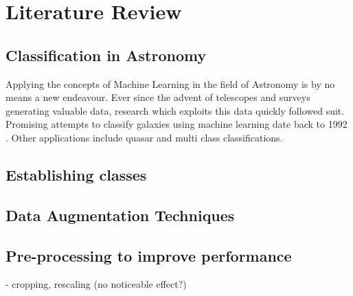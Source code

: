 
\chapter{Literature Review}

\section{Classification in Astronomy}

Applying the concepts of Machine Learning in the field of Astronomy is by no means a new endeavour.
Ever since the advent of telescopes and surveys generating valuable data, research which exploits this data quickly followed suit.
Promising attempts to classify galaxies using machine learning date back to 1992 \citep{storrie-lombardi_morphological_1992}.
Other applications include quasar \citep{richards_bayesian_2015} and multi class \citep{wang_j-plus_2022}\citep{baqui_minijpas_2021} classifications.

\section{Establishing classes}


\section{Data Augmentation Techniques}

\section{Pre-processing to improve performance}
    - cropping, rescaling (no noticeable effect?)\citep{dieleman_rotation-invariant_2015}
